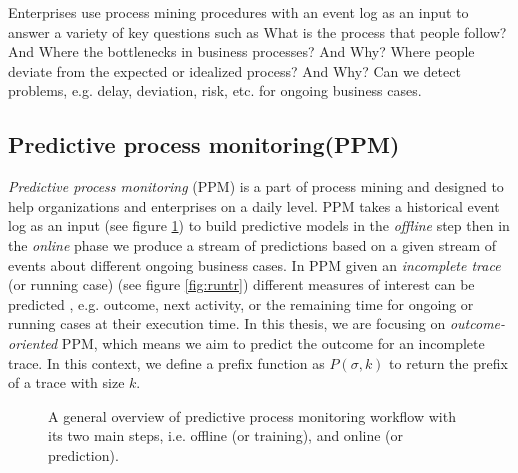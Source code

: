 Enterprises use process mining procedures with an event log as an input to answer a variety of key questions such as What is the process that people follow? And Where the bottlenecks in business processes? And Why? Where people deviate from the expected or idealized process? And Why? Can we detect problems, e.g. delay, deviation, risk, etc. for ongoing business cases. 

\subsection{Predictive process monitoring(PPM)}
\textit{Predictive process monitoring} (PPM) is a part of process mining and designed to help organizations and enterprises on a daily level. PPM takes a historical event log as an input (see figure \ref{fig:pmwf}) to build predictive models in the \textit{offline} step then in the \textit{online} phase we produce a stream of predictions based on a given stream of events about different ongoing business cases. In PPM given an \textit{incomplete trace} (or running case) (see figure \ref{fig:runtr}) different measures of interest can be predicted \cite{senderovich2019knowledge}, e.g. outcome,  next activity, or the remaining time for ongoing or running cases at their execution time. In this thesis, we are focusing on \textit{outcome-oriented} PPM, which means we aim to predict the outcome for an incomplete trace. In this context, we define a prefix function as $P(\sigma, k)$ to return the prefix of a trace with size $k$.


\begin{figure}[htb]
	\begin{center}
		\caption[Predictive process monitoring workflow]{A general overview of predictive process monitoring workflow with its two main steps, i.e. offline (or training), and online (or prediction).}
		\label{fig:pmwf}
	\end{center}
\end{figure}

